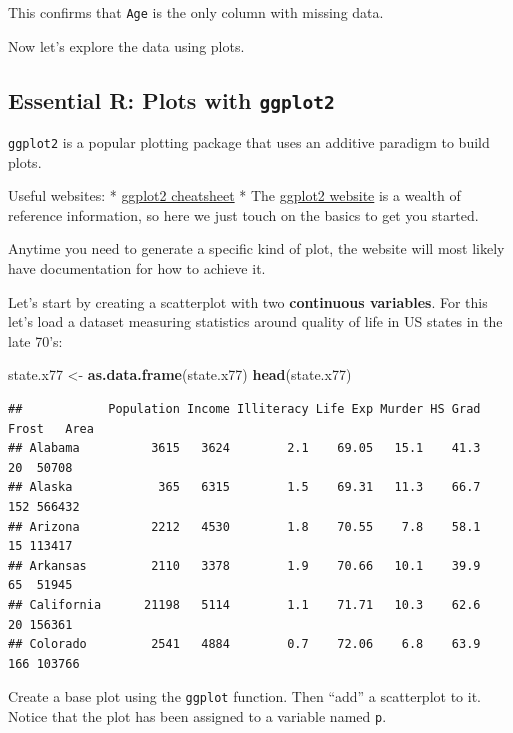 \documentclass[
]{book}
\newenvironment{Shaded}{\begin{snugshade}}{\end{snugshade}}
\newcommand{\FunctionTok}[1]{\textcolor[rgb]{0.13,0.29,0.53}{\textbf{#1}}}
\newcommand{\NormalTok}[1]{#1}
\newcommand{\OtherTok}[1]{\textcolor[rgb]{0.56,0.35,0.01}{#1}}
\begin{document}
This confirms that \texttt{Age} is the only column with missing data.

Now let's explore the data using plots.

\subsection{\texorpdfstring{Essential R: Plots with \texttt{ggplot2}}{Essential R: Plots with ggplot2}}\label{essential-r-plots-with-ggplot2}

\texttt{ggplot2} is a popular plotting package that uses an additive paradigm to build plots.

Useful websites:
* \href{https://rstudio.github.io/cheatsheets/html/data-visualization.html}{ggplot2 cheatsheet}
* The \href{https://ggplot2.tidyverse.org/}{ggplot2 website} is a wealth of reference information, so here we just touch on the basics to get you started.

Anytime you need to generate a specific kind of plot, the website will most likely have documentation for how to achieve it.

Let's start by creating a scatterplot with two \textbf{continuous variables}. For this let's load a dataset measuring statistics around quality of life in US states in the late 70's:

\begin{Shaded}
\begin{Highlighting}[]
\NormalTok{state.x77 }\OtherTok{\textless{}{-}} \FunctionTok{as.data.frame}\NormalTok{(state.x77)}
\FunctionTok{head}\NormalTok{(state.x77)}
\end{Highlighting}
\end{Shaded}

\begin{verbatim}
##            Population Income Illiteracy Life Exp Murder HS Grad Frost   Area
## Alabama          3615   3624        2.1    69.05   15.1    41.3    20  50708
## Alaska            365   6315        1.5    69.31   11.3    66.7   152 566432
## Arizona          2212   4530        1.8    70.55    7.8    58.1    15 113417
## Arkansas         2110   3378        1.9    70.66   10.1    39.9    65  51945
## California      21198   5114        1.1    71.71   10.3    62.6    20 156361
## Colorado         2541   4884        0.7    72.06    6.8    63.9   166 103766
\end{verbatim}

Create a base plot using the \texttt{ggplot} function. Then ``add'' a scatterplot to it. Notice that the plot has been assigned to a variable named \texttt{p}.
\end{document}
